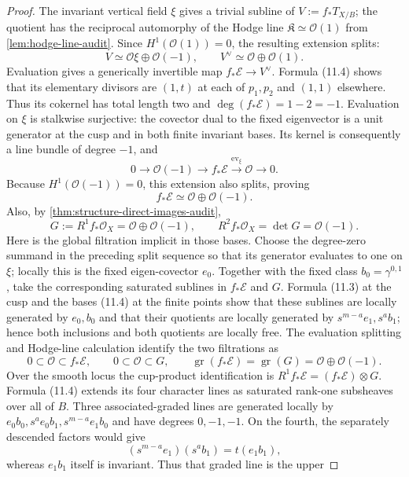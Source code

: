 \begin{proof}
The invariant vertical field $\xi$ gives a trivial subline of
$V:=f_*T_{X/B}$; the quotient has the reciprocal automorphy of the Hodge
line $\mathfrak K\simeq\mathcal O(1)$ from
\cref{lem:hodge-line-audit}.  Since $H^1(\mathcal O(1))=0$, the resulting
extension splits:
\[
 V\simeq\mathcal O\xi\oplus\mathcal O(-1),
 \qquad V^\vee\simeq\mathcal O\oplus\mathcal O(1).
\]
Evaluation gives a generically invertible map
$f_*\mathcal E\to V^\vee$.  Formula (11.4) shows that its elementary
divisors are $(1,t)$ at each of $p_1,p_2$ and $(1,1)$ elsewhere.  Thus its
cokernel has total length two and
\(\deg(f_*\mathcal E)=1-2=-1\).  Evaluation on $\xi$ is stalkwise
surjective: the covector dual to the fixed eigenvector is a unit generator
at the cusp and in both finite invariant bases.  Its kernel is consequently
a line bundle of degree $-1$, and
\[
 0\longrightarrow\mathcal O(-1)\longrightarrow f_*\mathcal E
 \xrightarrow{\operatorname{ev}_\xi}\mathcal O\longrightarrow0.
\]
Because $H^1(\mathcal O(-1))=0$, this extension also splits, proving
\[
 f_*\mathcal E\simeq\mathcal O\oplus\mathcal O(-1).
\]
Also, by 
\cref{thm:structure-direct-images-audit},
\[
 G:=R^1f_*\mathcal O_X=\mathcal O\oplus\mathcal O(-1),
 \qquad R^2f_*\mathcal O_X=\det G=\mathcal O(-1).
\tag{11.5}
\]
Here is the global filtration implicit in those bases.  Choose the
degree-zero summand in the preceding split sequence so that its generator
evaluates to one on $\xi$; locally this is the fixed eigen-covector $e_0$.
Together with the fixed class $b_0=\gamma^{0,1}$, take the corresponding
saturated sublines in $f_*\mathcal E$ and $G$.  Formula (11.3) at the cusp
and the bases (11.4) at the finite points show that these sublines are locally
generated by $e_0,b_0$ and that their quotients are locally generated by
$s^{m-a}e_1,s^ab_1$; hence both inclusions and both quotients are locally
free.  The evaluation splitting and Hodge-line calculation identify the two
filtrations as
\[
 0\subset\mathcal O\subset f_*\mathcal E,\qquad
 0\subset\mathcal O\subset G,\qquad
 \operatorname{gr}(f_*\mathcal E)=
 \operatorname{gr}(G)=\mathcal O\oplus\mathcal O(-1).
\]
Over the smooth locus the cup-product identification is
$R^1f_*\mathcal E=(f_*\mathcal E)\otimes G$.  Formula (11.4) extends its four
character lines as saturated rank-one subsheaves over all of $B$.  Three
associated-graded lines are generated locally by
$e_0b_0,s^ae_0b_1,s^{m-a}e_1b_0$ and have degrees $0,-1,-1$.  On the fourth,
the separately descended factors would
give
\[
 (s^{m-a}e_1)(s^ab_1)=t(e_1b_1),
\]
whereas $e_1b_1$ itself is invariant.  Thus that graded line is the upper

\end{proof}
